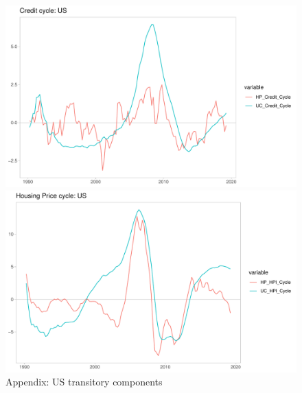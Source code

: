 \documentclass[fleqn]{article}
\begin{document}
\begin{outline}[enumerate]
\begin{figure}[h!]
\caption{Appendix: US transitory components}	
\centerline{\includegraphics[scale=0.7]{../Output/Graphs/Credit_cycle_US.pdf}}
\centerline{\includegraphics[scale=0.7]{../Output/Graphs/HP_cycle_US.pdf}}
\end{figure}


\end{outline}
\end{document}
